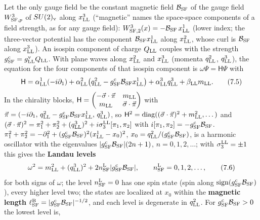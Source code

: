 \documentclass[
  10pt,
]{article}
\begin{document}
Let the only gauge field be the constant magnetic field
\(\mathcal B_{\rm SF}\) of the gauge field \(W^3_{{\rm SF},p}\) of
\(SU(2)_{\rm v}\) along \(x^3_{\rm LL}\) (``magnetic'' names the
space-space components of a field strength, as for any gauge field):
\(W^3_{{\rm SF},2}(x)=-\mathcal B_{\rm SF}\,x^1_{\rm LL}\) (lower index;
the three-vector potential has the component
\(\mathcal B_{\rm SF}x^1_{\rm LL}\) along \(x^2_{\rm LL}\), whose curl
is \(\mathcal B_{\rm SF}\) along \(x^3_{\rm LL}\)). An isospin component
of charge \(Q_{\rm LL}\) couples with the strength
\(g^{\rm c}_{\rm SF}=g^{\rm v}_{\rm LL}Q_{\rm LL}\). With plane waves
along \(x^2_{\rm LL}\) and \(x^3_{\rm LL}\) (momenta \(q^2_{\rm LL}\),
\(q^3_{\rm LL}\)), the equation for the four components of that isospin
component is \(\omega\Psi=\mathsf H\Psi\) with
\[\mathsf H=\alpha^1_{\rm LL}(-i\partial_1)+\alpha^2_{\rm LL}\big(q^2_{\rm LL}-g^{\rm c}_{\rm SF}\mathcal B_{\rm SF}x^1_{\rm LL}\big)+\alpha^3_{\rm LL}q^3_{\rm LL}+\beta_{\rm LL}m_{\rm LL}.\tag{7.5}\]
In the chirality blocks,
\(\mathsf H=\begin{pmatrix}-\vec\sigma\cdot\vec\pi&m_{\rm LL}\\m_{\rm LL}&\vec\sigma\cdot\vec\pi\end{pmatrix}\)
with
\(\vec\pi=(-i\partial_1,\,q^2_{\rm LL}-g^{\rm c}_{\rm SF}\mathcal B_{\rm SF}x^1_{\rm LL},\,q^3_{\rm LL})\),
so
\(\mathsf H^2=\mathrm{diag}((\vec\sigma\cdot\vec\pi)^2+m_{\rm LL}^2,\dots)\)
and
\((\vec\sigma\cdot\vec\pi)^2=\pi_1^2+\pi_2^2+(q^3_{\rm LL})^2+i\sigma^{\rm LL}_3[\pi_1,\pi_2]\)
with \(i[\pi_1,\pi_2]=-g^{\rm c}_{\rm SF}\mathcal B_{\rm SF}\).
\(\pi_1^2+\pi_2^2=-\partial_1^2+(g^{\rm c}_{\rm SF}\mathcal B_{\rm SF})^2(x^1_{\rm LL}-x_0)^2\),
\(x_0=q^2_{\rm LL}/(g^{\rm c}_{\rm SF}\mathcal B_{\rm SF})\), is a
harmonic oscillator with the eigenvalues
\(\lvert g^{\rm c}_{\rm SF}\mathcal B_{\rm SF}\rvert(2n+1)\),
\(n=0,1,2,\dots\); with \(\sigma^{\rm LL}_3=\pm1\) this gives the
\textbf{Landau levels}
\[\omega^2=m_{\rm LL}^2+(q^3_{\rm LL})^2+2n^{\rm L}_{\rm SF}\lvert g^{\rm c}_{\rm SF}\mathcal B_{\rm SF}\rvert,\qquad n^{\rm L}_{\rm SF}=0,1,2,\dots,\tag{7.6}\]
for both signs of \(\omega\); the level \(n^{\rm L}_{\rm SF}=0\) has one
spin state (spin along
\(\mathrm{sign}(g^{\rm c}_{\rm SF}\mathcal B_{\rm SF})\)), every higher
level two; the states are localized at \(x_0\) within the
\textbf{magnetic length}
\(\ell^{\rm B}_{\rm SF}=\lvert g^{\rm c}_{\rm SF}\mathcal B_{\rm SF}\rvert^{-1/2}\),
and each level is degenerate in \(q^2_{\rm LL}\). For
\(g^{\rm c}_{\rm SF}\mathcal B_{\rm SF}>0\) the lowest level is,
\end{document}
